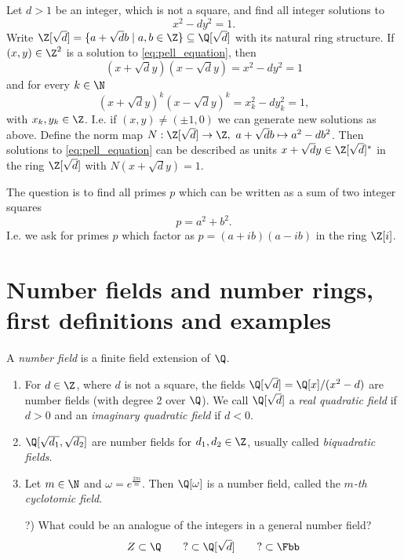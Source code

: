 
\begin{exmp*}
	Let \( d > 1 \) be an integer, which is not a square, and find all integer solutions to
	\begin{equation}\label{eq:pell_equation}
		x^2 - dy^2 = 1.
	\end{equation}
	Write \( \Z[\sqrt{d}] = \{a+\sqrt{d}b \mid a,b \in \Z\} \subseteq \Q[\sqrt{d}] \) with its natural ring structure.
	If \( (x,y) \in \Z^2 \) is a solution to \eqref{eq:pell_equation}, then
	\[ (x+\sqrt{d}y)(x-\sqrt{d}y) = x^2-dy^2 = 1 \]
	and for every \( k \in \N \)
	\[ (x+\sqrt{d}y)^k(x-\sqrt{d}y)^k = x_k^2-dy_k^2 = 1, \]
	with \( x_k,y_k \in \Z \).
	I.e. if \( (x,y) \neq (\pm 1, 0) \) we can generate new solutions as above.
	Define the norm map \( N: \Z[\sqrt{d}] \to \Z,\ a+\sqrt{d}b \mapsto a^2 - db^2 \).
	Then solutions to \eqref{eq:pell_equation} can be described as units \( x+\sqrt{d}y \in \Z[\sqrt{d}]^* \) in the ring \( \Z[\sqrt{d}] \) with \( N(x+\sqrt{d}y) = 1 \).
\end{exmp*}

\begin{exmp*}
	The question is to find all primes \( p \) which can be written as a sum of two integer squares
	\[ p=a^2+b^2. \]
	I.e. we ask for primes \( p \) which factor as \( p = (a+ib)(a-ib) \) in the ring \( \Z[i] \).
\end{exmp*}


\section[Number fields and number rings]{Number fields and number rings, first definitions and examples}

\begin{defn*}
	A \emph{number field} is a finite field extension of \( \Q \).
\end{defn*}

\begin{exmp*}
	\begin{enumerate}[label={\alph*})]
		\item For \( d \in \Z \), where \( d \) is not a square, the fields \( \Q[\sqrt{d}] = \Q[x] / (x^2-d) \) are number fields (with degree 2 over \( \Q \)).
			We call \( \Q[\sqrt{d}] \) a \emph{real quadratic field} if \( d > 0 \) and an \emph{imaginary quadratic field} if \( d < 0 \).
		\item \( \Q[\sqrt{d_1}, \sqrt{d_2}] \) are number fields for \( d_1, d_2 \in \Z \), usually called \emph{biquadratic fields}.
		\item Let \( m \in \N \) and \( \omega = e^\frac{2\pi i}{m} \).
			Then \( \Q[\omega] \) is a number field, called the \emph{\( m \)-th cyclotomic field}.
		\item[?)] What could be an analogue of the integers in a general number field?
			\[ Z \subset \Q \qquad ? \subset \Q[\sqrt{d}] \qquad ? \subset \Fbb \]
	\end{enumerate}
\end{exmp*}

